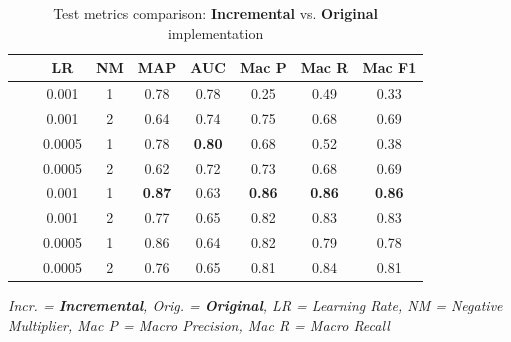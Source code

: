 \begin{table}[h]
	\centering
	\caption{Test metrics comparison: \textcolor{drawblue}{\textbf{Incremental}} vs. \textcolor{drawred}{\textbf{Original}} implementation}
	\label{tab:results_comparison}
	\small
	\begin{tabular}{llccccccc}
		\toprule
		 &  & \textbf{LR} & \textbf{NM} & \textbf{MAP}  & \textbf{AUC}  & \textbf{Mac P} & \textbf{Mac R} & \textbf{Mac F1} \\
		\midrule
		\multirow{4}{*}{\rotatebox{90}{\textcolor{drawblue}{\textbf{Incr.}}}}
		 &  & 0.001       & 1           & 0.78          & 0.78          & 0.25           & 0.49           & 0.33            \\
		 &  & 0.001       & 2           & 0.64          & 0.74          & 0.75           & 0.68           & 0.69            \\
		 &  & 0.0005      & 1           & 0.78          & \textbf{0.80} & 0.68           & 0.52           & 0.38            \\
		 &  & 0.0005      & 2           & 0.62          & 0.72          & 0.73           & 0.68           & 0.69            \\
		\midrule
		\multirow{4}{*}{\rotatebox{90}{\textcolor{drawred}{\textbf{Orig.}}}}
		 &  & 0.001       & 1           & \textbf{0.87} & 0.63          & \textbf{0.86}  & \textbf{0.86}  & \textbf{0.86}   \\
		 &  & 0.001       & 2           & 0.77          & 0.65          & 0.82           & 0.83           & 0.83            \\
		 &  & 0.0005      & 1           & 0.86          & 0.64          & 0.82           & 0.79           & 0.78            \\
		 &  & 0.0005      & 2           & 0.76          & 0.65          & 0.81           & 0.84           & 0.81            \\
		\bottomrule
	\end{tabular}

	\vspace{0.5em}
	\footnotesize
	\textit{Incr. = \textcolor{drawblue}{\textbf{Incremental}}, Orig. = \textcolor{drawred}{\textbf{Original}}, LR = Learning Rate, NM = Negative Multiplier, Mac P = Macro Precision, Mac R = Macro Recall}
\end{table}



